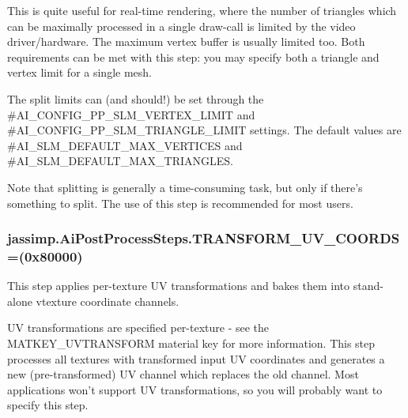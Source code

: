 {This is quite useful for real-\/time rendering, where the number of triangles which can be maximally processed in a single draw-\/call is limited by the video driver/hardware. The maximum vertex buffer is usually limited too. Both requirements can be met with this step\+: you may specify both a triangle and vertex limit for a single mesh.

The split limits can (and should!) be set through the {\ttfamily \#\+A\+I\+\_\+\+C\+O\+N\+F\+I\+G\+\_\+\+P\+P\+\_\+\+S\+L\+M\+\_\+\+V\+E\+R\+T\+E\+X\+\_\+\+L\+I\+M\+I\+T} and {\ttfamily \#\+A\+I\+\_\+\+C\+O\+N\+F\+I\+G\+\_\+\+P\+P\+\_\+\+S\+L\+M\+\_\+\+T\+R\+I\+A\+N\+G\+L\+E\+\_\+\+L\+I\+M\+I\+T} settings. The default values are {\ttfamily \#\+A\+I\+\_\+\+S\+L\+M\+\_\+\+D\+E\+F\+A\+U\+L\+T\+\_\+\+M\+A\+X\+\_\+\+V\+E\+R\+T\+I\+C\+E\+S} and {\ttfamily \#\+A\+I\+\_\+\+S\+L\+M\+\_\+\+D\+E\+F\+A\+U\+L\+T\+\_\+\+M\+A\+X\+\_\+\+T\+R\+I\+A\+N\+G\+L\+E\+S}.

Note that splitting is generally a time-\/consuming task, but only if there's something to split. The use of this step is recommended for most users. \hypertarget{enumjassimp_1_1_ai_post_process_steps_ab38ffd98a316098b5b49e9dd85d22c33}{
\subsubsection[{T\+R\+A\+N\+S\+F\+O\+R\+M\+\_\+\+U\+V\+\_\+\+C\+O\+O\+R\+D\+S}]{\setlength{\rightskip}{0pt plus 5cm}jassimp.\+Ai\+Post\+Process\+Steps.\+T\+R\+A\+N\+S\+F\+O\+R\+M\+\_\+\+U\+V\+\_\+\+C\+O\+O\+R\+D\+S =(0x80000)}}\label{enumjassimp_1_1_ai_post_process_steps_ab38ffd98a316098b5b49e9dd85d22c33}
This step applies per-\/texture U\+V transformations and bakes them into stand-\/alone vtexture coordinate channels.

U\+V transformations are specified per-\/texture -\/ see the {\ttfamily M\+A\+T\+K\+E\+Y\+\_\+\+U\+V\+T\+R\+A\+N\+S\+F\+O\+R\+M} material key for more information. This step processes all textures with transformed input U\+V coordinates and generates a new (pre-\/transformed) U\+V channel which replaces the old channel. Most applications won't support U\+V transformations, so you will probably want to specify this step.

}
